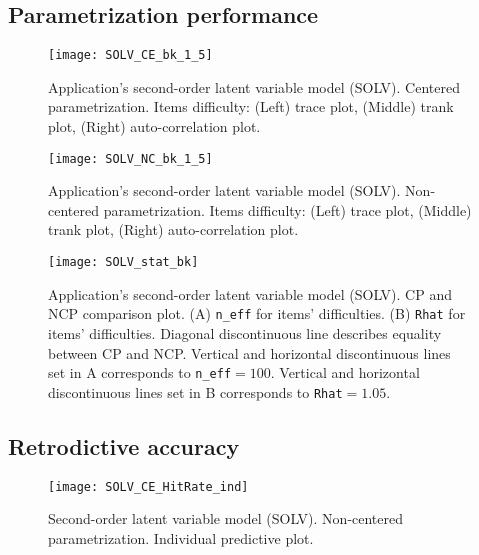 \subsection{Parametrization performance} \label{app_c5:noncenter}

%
\begin{figure}[H]
	\centering
	\texttt{[image: SOLV\_CE\_bk\_1\_5]}
	\caption[Application's second-order latent variable model (SOLV). Centered parametrization. Items difficulty. Trace, trank and auto-correlation plots.]%
	{Application's second-order latent variable model (SOLV). Centered parametrization. Items difficulty: (Left) trace plot, (Middle) trank plot, (Right) auto-correlation plot.}
	\label{fig:SOLV_CE_appchains1}
\end{figure}

%
\begin{figure}[H]
	\centering
	\texttt{[image: SOLV\_NC\_bk\_1\_5]}
	\caption[Application's second-order latent variable model (SOLV). Non-centered parametrization. Items difficulty. Trace, trank and auto-correlation plots.]%
	{Application's second-order latent variable model (SOLV). Non-centered parametrization. Items difficulty: (Left) trace plot, (Middle) trank plot, (Right) auto-correlation plot.}
	\label{fig:SOLV_NC_appchains1}
\end{figure}
%
\begin{figure}[H]
	\centering
	\texttt{[image: SOLV\_stat\_bk]}
	\caption[Application's second-order latent variable model (SOLV). CP and NCP comparison plot.]%
	{Application's second-order latent variable model (SOLV). CP and NCP comparison plot. (A) \texttt{n\_eff} for items' difficulties. (B) \texttt{Rhat} for items' difficulties. Diagonal discontinuous line describes equality between CP and NCP. Vertical and horizontal discontinuous lines set in A corresponds to \texttt{n\_eff}$=100$. Vertical and horizontal discontinuous lines set in B corresponds to \texttt{Rhat}$=1.05$. }
	\label{fig:SOLV_stat_bk1}
\end{figure}



\subsection{Retrodictive accuracy} \label{app_c5:retrodict_app}
%
\begin{figure}[H]
	\centering
	\texttt{[image: SOLV\_CE\_HitRate\_ind]}
	\caption[Second-order latent variable model (SOLV). Non-centered parametrization. Individual predictive plot.]%
	{Second-order latent variable model (SOLV). Non-centered parametrization. Individual predictive plot.}
	\label{fig:SOLV_pred_app}
\end{figure}

